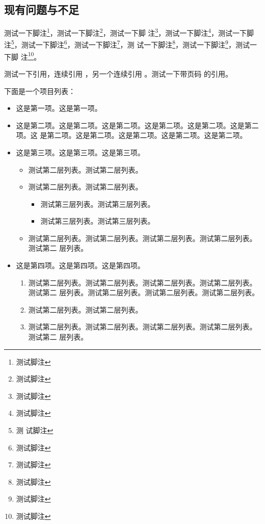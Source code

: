 \documentclass[phd]{jnuthesis}
\begin{document}
\subsection{现有问题与不足}

测试一下脚注\footnote{测试脚注}，测试一下脚注\footnote{测试脚注}，测试一下脚
注\footnote{测试脚注}，测试一下脚注\footnote{测试脚注}，测试一下脚注\footnote{测
  试脚注}，测试一下脚注\footnote{测试脚注}，测试一下脚注\footnote{测试脚注}，测
试一下脚注\footnote{测试脚注}，测试一下脚注\footnote{测试脚注}，测试一下脚
注\footnote{测试脚注}。

测试一下引用\cite{newman2006structure}，连续引用
\cite{newman2001random,aiello2000random,bollobas2001random}，另一个连续引用
\cite{newman2001random,bollobas2001random,barabasi1999emergence}。测试一下带页码
的引用\cite[124--128]{erdHos1961strength}。

下面是一个项目列表：

\begin{itemize}
\item 这是第一项。这是第一项。
\item 这是第二项。这是第二项。这是第二项。这是第二项。这是第二项。这是第二项。这
  是第二项。这是第二项。这是第二项。这是第二项。这是第二项。
\item 这是第三项。这是第三项。这是第三项。
  \begin{itemize}
  \item 测试第二层列表。测试第二层列表。
  \item 测试第二层列表。测试第二层列表。
  \begin{itemize}
     \item 测试第三层列表。测试第三层列表。
     \item 测试第三层列表。测试第三层列表。
  \end{itemize}
  \item 测试第二层列表。测试第二层列表。测试第二层列表。测试第二层列表。测试第二
    层列表。
  \end{itemize}
\item 这是第四项。这是第四项。这是第四项。
  \begin{enumerate}
  \item 测试第二层列表。测试第二层列表。测试第二层列表。测试第二层列表。测试第二
    层列表。测试第二层列表。测试第二层列表。测试第二层列表。
  \item 测试第二层列表。测试第二层列表。
  \item 测试第二层列表。测试第二层列表。测试第二层列表。测试第二层列表。测试第二
    层列表。
  \end{enumerate}
\end{itemize}
\end{document}
